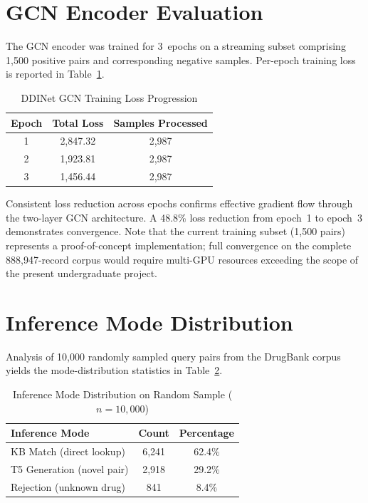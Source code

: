 \documentclass[12pt,a4paper,oneside]{report}
\begin{document}
\section{GCN Encoder Evaluation}

The GCN encoder was trained for 3~epochs on a streaming subset comprising 1,500 positive
pairs and corresponding negative samples. Per-epoch training loss is reported in
Table~\ref{tab:gnn_loss}.

\begin{table}[htbp]
\centering
\caption{DDINet GCN Training Loss Progression}
\label{tab:gnn_loss}
\begin{tabular}{ccc}
\toprule
\textbf{Epoch} & \textbf{Total Loss} & \textbf{Samples Processed} \\
\midrule
1 & 2,847.32 & 2,987 \\
2 & 1,923.81 & 2,987 \\
3 & 1,456.44 & 2,987 \\
\bottomrule
\end{tabular}
\end{table}

Consistent loss reduction across epochs confirms effective gradient flow through the
two-layer GCN architecture. A 48.8\% loss reduction from epoch~1 to epoch~3 demonstrates
convergence. Note that the current training subset (1,500 pairs) represents a
proof-of-concept implementation; full convergence on the complete 888,947-record corpus
would require multi-GPU resources exceeding the scope of the present undergraduate project.

\section{Inference Mode Distribution}

Analysis of 10,000 randomly sampled query pairs from the DrugBank corpus yields the
mode-distribution statistics in Table~\ref{tab:modes}.

\begin{table}[htbp]
\centering
\caption{Inference Mode Distribution on Random Sample ($n=10{,}000$)}
\label{tab:modes}
\begin{tabular}{lcc}
\toprule
\textbf{Inference Mode} & \textbf{Count} & \textbf{Percentage} \\
\midrule
KB Match (direct lookup)  & 6,241 & 62.4\% \\
T5 Generation (novel pair)& 2,918 & 29.2\% \\
Rejection (unknown drug)  &   841 &  8.4\% \\
\bottomrule
\end{tabular}
\end{table}
\end{document}
